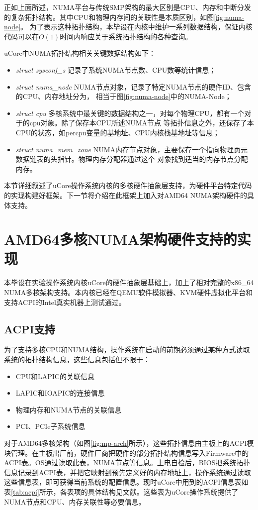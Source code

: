 正如上面所述，NUMA平台与传统SMP架构的最大区别是CPU、内存和中断分发的复杂拓扑结构。其中CPU和物理内存间的关联性是本质区别，如图\ref{fig:numa-node}。
为了表示这种拓扑结构，本毕设在内核中维护一系列数据结构，保证内核代码可以在$O(1)$时间内响应关于系统拓扑结构的各种查询。

uCore中NUMA拓扑结构相关关键数据结构如下：
\begin{itemize}
\item \emph{struct sysconf\_s}  \pozhehao 记录了系统NUMA节点数、CPU数等统计信息；
\item \emph{struct numa\_node} \pozhehao NUMA节点对象，记录了特定NUMA节点的硬件ID、包含的CPU、内存地址分为，
	相当于图\ref{fig:numa-node}中的NUMA-Node；
\item \emph{struct cpu} \pozhehao 多核系统中最关键的数据结构之一，对每个物理CPU，都有一个对于的cpu对象。除了保存本CPU所述NUMA节点
等拓扑信息之外，还保存了本CPU的状态，如percpu变量的基地址、CPU内核栈基地址等信息；
\item \emph{struct numa\_mem\_zone} \pozhehao NUMA内存节点对象，主要保存一个指向物理页元数据链表的头指针。物理内存分配器通过这个
对象找到适当的内存节点分配内存。
\end{itemize}

本节详细叙述了uCore操作系统内核的多核硬件抽象层支持，为硬件平台特定代码的实现构建好框架。下一节将介绍在此框架上加入对AMD64 NUMA架构硬件的具体支持。


\section{AMD64多核NUMA架构硬件支持的实现}
本毕设在实验操作系统内核uCore的硬件抽象层基础上，加上了相对完整的x86\_64
NUMA多核架构支持。本内核已经在QEMU软件模拟器、KVM硬件虚拟化平台和支持ACPI的Intel真实机器上测试通过。

\subsection{ACPI支持}
为了支持多核CPU和NUMA结构，操作系统在启动的前期必须通过某种方式读取系统的拓扑结构信息，这些信息包括但不限于：
\begin{itemize}
\item CPU和LAPIC的关联信息
\item LAPIC和IOAPIC的连接信息
\item 物理内存和NUMA节点的关联信息
\item PCI、PCIe子系统信息
\end{itemize}

对于AMD64多核架构（如图\ref{fig:mp-arch}所示），这些拓扑信息由主板上的ACPI模块管理。在主板出厂前，硬件厂商把硬件的部分拓扑结构信息写入Firmware中的
	ACPI表。OS通过读取此表，NUMA节点等信息。上电自检后，BIOS把系统拓扑信息记录到ACPI表，并把它映射到预先定义好的内存地址上，操作系统通过读取这些信息表，即可获得当前系统的配置信息。现时uCore中用到的ACPI信息表如表\ref{tab:acpi}所示，各表项的具体结构见文献\cite{acpica}。这些表为uCore操作系统提供了NUMA节点和CPU、内存关联性等必要信息。

